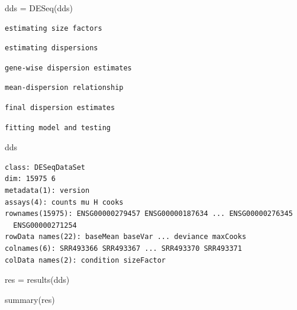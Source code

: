 \documentclass[
  letterpaper,
  DIV=11,
  numbers=noendperiod]{scrartcl}
\newenvironment{Shaded}{\begin{snugshade}}{\end{snugshade}}
\newcommand{\FunctionTok}[1]{\textcolor[rgb]{0.28,0.35,0.67}{#1}}
\newcommand{\NormalTok}[1]{\textcolor[rgb]{0.00,0.23,0.31}{#1}}
\newcommand{\OtherTok}[1]{\textcolor[rgb]{0.00,0.23,0.31}{#1}}
\begin{document}
\begin{Shaded}
\begin{Highlighting}[]
\NormalTok{dds }\OtherTok{=} \FunctionTok{DESeq}\NormalTok{(dds)}
\end{Highlighting}
\end{Shaded}

\begin{verbatim}
estimating size factors
\end{verbatim}

\begin{verbatim}
estimating dispersions
\end{verbatim}

\begin{verbatim}
gene-wise dispersion estimates
\end{verbatim}

\begin{verbatim}
mean-dispersion relationship
\end{verbatim}

\begin{verbatim}
final dispersion estimates
\end{verbatim}

\begin{verbatim}
fitting model and testing
\end{verbatim}

\begin{Shaded}
\begin{Highlighting}[]
\NormalTok{dds}
\end{Highlighting}
\end{Shaded}

\begin{verbatim}
class: DESeqDataSet 
dim: 15975 6 
metadata(1): version
assays(4): counts mu H cooks
rownames(15975): ENSG00000279457 ENSG00000187634 ... ENSG00000276345
  ENSG00000271254
rowData names(22): baseMean baseVar ... deviance maxCooks
colnames(6): SRR493366 SRR493367 ... SRR493370 SRR493371
colData names(2): condition sizeFactor
\end{verbatim}

\begin{Shaded}
\begin{Highlighting}[]
\NormalTok{res }\OtherTok{=} \FunctionTok{results}\NormalTok{(dds)}

\FunctionTok{summary}\NormalTok{(res)}
\end{Highlighting}
\end{Shaded}
\end{document}

